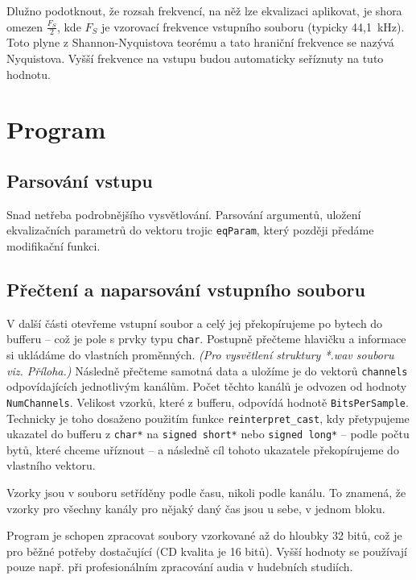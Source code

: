 \documentclass[11pt]{article} %
\begin{document}
Dlužno podotknout, že rozsah frekvencí, na něž lze ekvalizaci aplikovat, je shora omezen $\frac{F_S}{2}$, kde $F_S$ je vzorovací frekvence vstupního souboru (typicky 44,1~kHz). Toto plyne z Shannon-Nyquistova teorému a tato hraniční frekvence se nazývá Nyquistova. Vyšší frekvence na vstupu budou automaticky seříznuty na tuto hodnotu.

\section{Program}
\subsection{Parsování vstupu}
Snad netřeba podrobnějšího vysvětlování. Parsování argumentů, uložení ekvalizačních parametrů do vektoru trojic \texttt{eqParam}, který později předáme modifikační funkci.

\subsection{Přečtení a naparsování vstupního souboru}
V další části otevřeme vstupní soubor a celý jej překopírujeme po bytech do bufferu -- což je pole s prvky typu \texttt{char}. Postupně přečteme hlavičku a informace si ukládáme do vlastních proměnných. \emph{(Pro vysvětlení struktury *.wav souboru viz. Příloha.)} Následně přečteme samotná data a uložíme je do vektorů \texttt{channels} odpovídajících jednotlivým kanálům. Počet těchto kanálů je odvozen od hodnoty \texttt{NumChannels}. Velikost vzorků, které  z bufferu, odpovídá hodnotě \texttt{BitsPerSample}. Technicky je toho dosaženo použitím funkce \texttt{reinterpret\_cast}, kdy přetypujeme ukazatel do bufferu z \texttt{char*} na \texttt{signed short*} nebo \texttt{signed long*} -- podle počtu bytů, které chceme uříznout -- a následně cíl tohoto ukazatele překopírujeme do vlastního vektoru.

Vzorky jsou v souboru setříděny podle času, nikoli podle kanálu. To znamená, že vzorky pro všechny kanály pro nějaký daný čas jsou u sebe, v jednom bloku.

Program je schopen zpracovat soubory vzorkované až do hloubky 32 bitů, což je pro běžné potřeby dostačující (CD kvalita je 16 bitů). Vyšší hodnoty se používají pouze např. při profesionálním zpracování audia v hudebních studiích.
\end{document}
